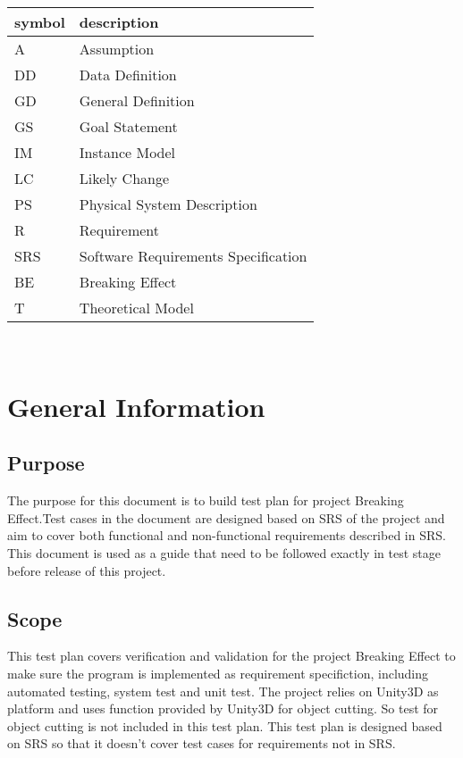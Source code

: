 \documentclass[12pt, titlepage]{article}
\begin{document}
	\renewcommand{\arraystretch}{1.2}
	\begin{tabular}{l l} 
		\toprule		
		\textbf{symbol} & \textbf{description}\\
		\midrule 
		A & Assumption\\
		DD & Data Definition\\
		GD & General Definition\\
		GS & Goal Statement\\
		IM & Instance Model\\
		LC & Likely Change\\
		PS & Physical System Description\\
		R & Requirement\\
		SRS & Software Requirements Specification\\
		BE & Breaking Effect\\
		T & Theoretical Model\\
		\bottomrule
	\end{tabular}\\
	
	
\newpage

\tableofcontents

\listoftables

\listoffigures

\newpage


\section{General Information}

\subsection{Purpose}

The purpose for this document is to build test plan for project Breaking Effect.Test cases in the document are designed based on SRS of the project and aim to cover both functional and non-functional requirements described in SRS.\\ 

This document is used as a guide that need to be followed exactly in test stage before release of this project. \\

\subsection{Scope}
This test plan covers verification and validation for the project Breaking Effect to make sure the program is implemented as requirement specifiction, including automated testing, system test and unit test. The project relies on Unity3D as platform and uses function provided by Unity3D for object cutting. So test for object cutting is not included in this test plan. This test plan is designed based on SRS so that it doesn't cover test cases for requirements not in SRS. 
\end{document}
